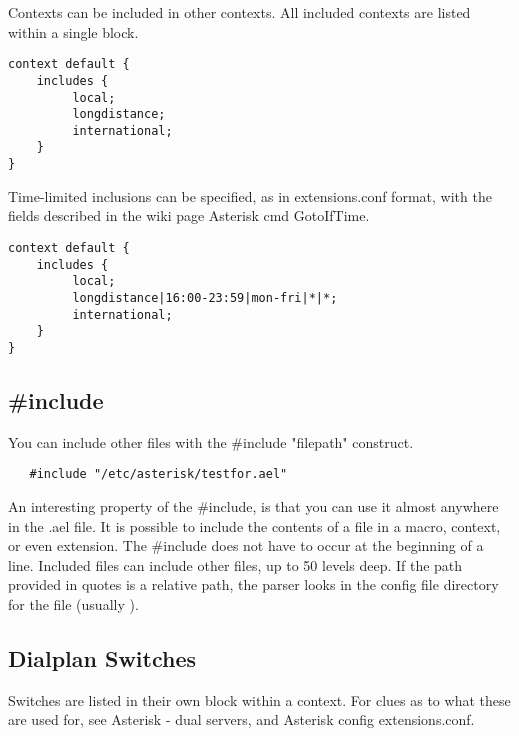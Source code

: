 {Contexts can be included in other contexts. All included contexts are
listed within a single block.

\begin{astlisting}
\begin{verbatim}
context default {
    includes {
         local;
         longdistance;
         international;
    }
}
\end{verbatim}
\end{astlisting}

Time-limited inclusions can be specified, as in extensions.conf
format, with the fields described in the wiki page Asterisk cmd
GotoIfTime.

\begin{astlisting}
\begin{verbatim}
context default {
    includes {
         local;
         longdistance|16:00-23:59|mon-fri|*|*;
         international;
    }
}
\end{verbatim}
\end{astlisting}

\subsection{\#include}

You can include other files with the \#include "filepath" construct.

\begin{astlisting}
\begin{verbatim}
   #include "/etc/asterisk/testfor.ael"
\end{verbatim}
\end{astlisting}

An interesting property of the \#include, is that you can use it almost
anywhere in the .ael file. It is possible to include the contents of
a file in a macro, context, or even extension.  The \#include does not
have to occur at the beginning of a line. Included files can include
other files, up to 50 levels deep. If the path provided in quotes is a
relative path, the parser looks in the config file directory for the
file (usually ).



\subsection{Dialplan Switches}

Switches are listed in their own block within a context. For clues as
to what these are used for, see Asterisk - dual servers, and Asterisk
config extensions.conf.

}
